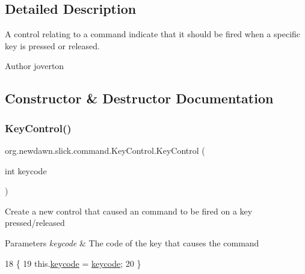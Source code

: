 \subsection{Detailed Description}
A control relating to a command indicate that it should be fired when a specific key is pressed or released.

\begin{DoxyAuthor}{Author}
joverton 
\end{DoxyAuthor}


\subsection{Constructor \& Destructor Documentation}
\mbox{\label{classorg_1_1newdawn_1_1slick_1_1command_1_1_key_control_ae585fe955bcc9da50286f092dd9ee7f4}} 
\subsubsection{\texorpdfstring{Key\+Control()}{KeyControl()}}
{\footnotesize\ttfamily org.\+newdawn.\+slick.\+command.\+Key\+Control.\+Key\+Control (\begin{DoxyParamCaption}\item[{int}]{keycode }\end{DoxyParamCaption})\hspace{0.3cm}{\ttfamily [inline]}}

Create a new control that caused an command to be fired on a key pressed/released


\begin{DoxyParams}{Parameters}
{\em keycode} & The code of the key that causes the command \\
\hline
\end{DoxyParams}

\begin{DoxyCode}
18                                    \{     
19         this.\mbox{\hyperlink{classorg_1_1newdawn_1_1slick_1_1command_1_1_key_control_ad8edd8c70be8e811bbc7049f9fea0746}{keycode}} = \mbox{\hyperlink{classorg_1_1newdawn_1_1slick_1_1command_1_1_key_control_ad8edd8c70be8e811bbc7049f9fea0746}{keycode}};
20     \}
\end{DoxyCode}


